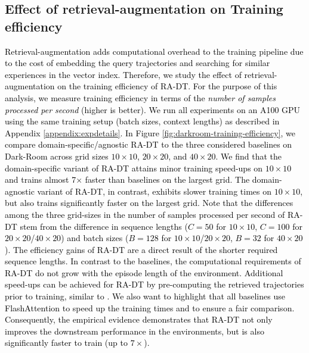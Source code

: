 \documentclass{article}
\newcommand{\rebuttal}[1]{\textcolor{black}{#1}}
\begin{document}
\subsection{Effect of retrieval-augmentation on Training efficiency} \label{appendix:training-efficiency}
\rebuttal{
Retrieval-augmentation adds computational overhead to the training pipeline due to the cost of embedding the query trajectories and searching for similar experiences in the vector index.
Therefore, we study the effect of retrieval-augmentation on the training efficiency of RA-DT.
For the purpose of this analysis, we measure training efficiency in terms of the \textit{number of samples processed per second} (higher is better).
We run all experiments on an A100 GPU using the same training setup (batch sizes, context lengths) as described in Appendix \ref{appendix:expdetails}.
}
\rebuttal{
In Figure \ref{fig:darkroom-training-efficiency}, we compare domain-specific/agnostic RA-DT to the three considered baselines on Dark-Room across grid sizes $10\times10$, $20\times20$, and $40\times20$.
We find that the domain-specific variant of RA-DT attains minor training speed-ups on $10\times10$ and trains almost 7$\times$ faster than baselines on the largest grid.
The domain-agnostic variant of RA-DT, in contrast, exhibits slower training times on $10\times10$, but also trains significantly faster on the largest grid.
Note that the differences among the three grid-sizes in the number of samples processed per second of RA-DT stem from the difference in sequence lengths ($C=50$ for $10\times10$, $C=100$ for $20\times20$/$40\times20$) and batch sizes ($B=128$ for $10\times10$/$20\times20$, $B=32$ for $40\times20$).
}
\rebuttal{
The efficiency gains of RA-DT are a direct result of the shorter required sequence lengths.
In contrast to the baselines, the computational requirements of RA-DT do not grow with the episode length of the environment.
Additional speed-ups can be achieved for RA-DT by pre-computing the retrieved trajectories prior to training, similar to \citet{Borgeaud:22}.
We also want to highlight that all baselines use FlashAttention to speed up the training times and to ensure a fair comparison.
Consequently, the empirical evidence demonstrates that RA-DT not only improves the downstream performance in the environments, but is also significantly faster to train (up to $7\times$).
}
\end{document}
